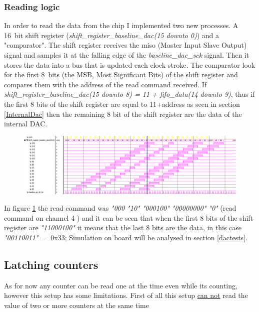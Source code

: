 \subsubsection{Reading logic}
In order to read the data from the chip I implemented two new processes. A 16~bit shift register (\textit{shift\_register\_baseline\_dac(15 downto 0)}) and a "comparator".
The shift register receives the miso (Master Input Slave Output) signal and samples it at the falling edge of the \textit{baseline\_dac\_sck} signal. Then it stores the data into a bus that is updated each clock stroke.
The comparator look for the first 8~bits (the MSB, Most Significant Bits) of the shift register and compares them with the address of the read command received.
If \textit{shift\_register\_baseline\_dac(15 downto 8) = 11 + fifo\_data(14 downto 9)}, thus if the first 8 bits of the shift register are equal to 11+address as seen in section \ref{InternalDac} then the remaining 8 bit of the shift register are the data of the internal DAC.
\begin{figure}[H]
	\centering
	\includegraphics[width=1.0\linewidth]{IMG/ch4/DACsimulations/FSMshiftregister}
	\caption{}
	\label{fig:fsmshiftregister}
\end{figure}
\noindent In figure \ref{fig:fsmshiftregister} the read command was \textit{"000 "10" "000100" "00000000" "0"} (read command on channel 4 ) and it can be seen that when the first 8 bits of the shift register are \textit{"11000100"} it means that the last 8 bits are the data, in this case \textit{"00110011"}~=~0x33;
\newline
Simulation on board will be analysed  in section \ref{dactests}.

\subsection{Latching counters}\label{Latch}
\noindent As for now any counter can be read one at the time even while its counting, however this setup has some limitations. First of all this setup \underline{can not} read the value of two or more counters at the same time   

